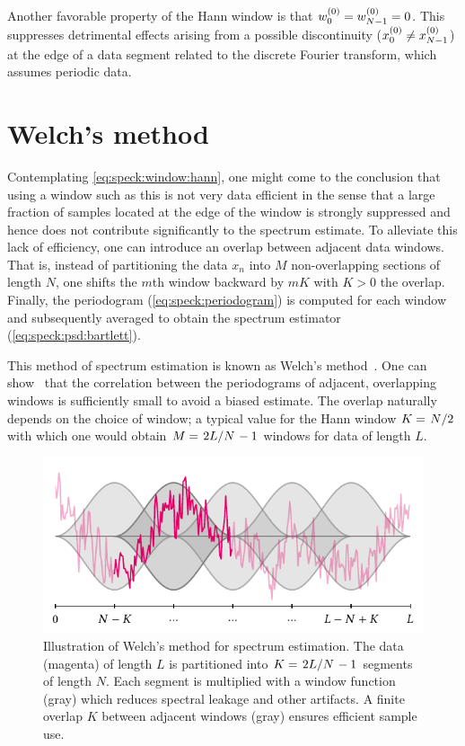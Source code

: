 Another favorable property of the Hann window is that $w_0^{(0)} = w_{N-1}^{(0)} = 0$.
This suppresses detrimental effects arising from a possible discontinuity ($x_0^{(0)}\neq x_{N-1}^{(0)}$) at the edge of a data segment related to the discrete Fourier transform, which assumes periodic data.

\section{Welch's method}\label{sec:speck:theory:welch}
Contemplating \cref{eq:speck:window:hann}, one might come to the conclusion that using a window such as this is not very data efficient in the sense that a large fraction of samples located at the edge of the window is strongly suppressed and hence does not contribute significantly to the spectrum estimate.
To alleviate this lack of efficiency, one can introduce an overlap between adjacent data windows.
That is, instead of partitioning the data $x_n$ into $M$ non-overlapping sections of length $N$, one shifts the $m$th window backward by $mK$ with $K>0$ the overlap.
Finally, the periodogram (\cref{eq:speck:periodogram}) is computed for each window and subsequently averaged to obtain the spectrum estimator (\cref{eq:speck:psd:bartlett}).

This method of spectrum estimation is known as Welch's method~\cite{Welch1967}.
One can show~\cite{Welch1967} that the correlation between the periodograms of adjacent, overlapping windows is sufficiently small to avoid a biased estimate.
The overlap naturally depends on the choice of window; a typical value for the Hann window $K = \flatfrac{N}{2}$ with which one would obtain $M = \flatfrac{2L}{N} - 1$ windows for data of length $L$.
\begin{figure}
    \centering
    \includegraphics[width=\textwidth]{img/pdf/spectrometer/welch}
    \caption[]{
        Illustration of Welch's method for spectrum estimation.
        The data (magenta) of length $L$ is partitioned into $K = \flatfrac{2L}{N} - 1$ segments of length $N$.
        Each segment is multiplied with a window function (gray) which reduces spectral leakage and other artifacts.
        A finite overlap $K$ between adjacent windows (gray) ensures efficient sample use.
    }
    \label{fig:speck:welch}
\end{figure}

